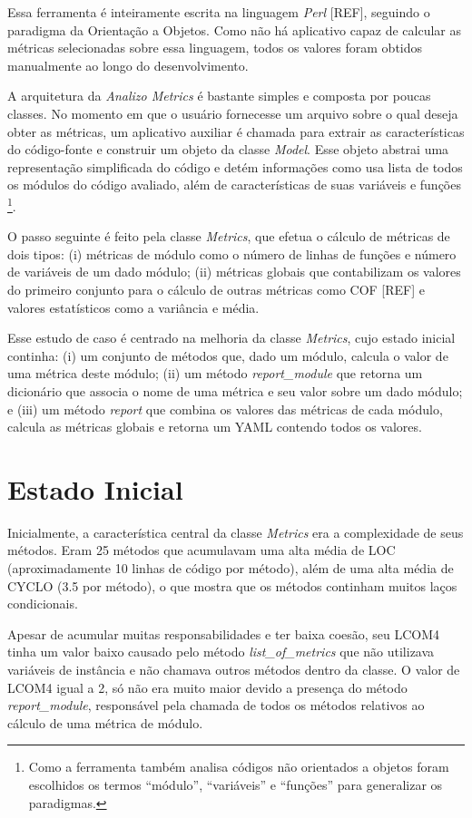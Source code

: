 Essa ferramenta é inteiramente escrita na linguagem \textit{Perl} [REF], seguindo o paradigma da
Orientação a Objetos. Como não há aplicativo capaz de calcular as métricas selecionadas
sobre essa linguagem, todos os valores foram obtidos manualmente ao longo do desenvolvimento.

A arquitetura da \textit{Analizo Metrics} é bastante simples e composta por poucas classes.
No momento em que o usuário fornecesse um arquivo sobre o qual deseja obter as métricas, um aplicativo
auxiliar é chamada para extrair as características do código-fonte e construir um objeto da
classe \textit{Model}. Esse objeto abstrai uma representação simplificada do código e detém 
informações como usa lista de todos os módulos do código avaliado, além de características
de suas variáveis e funções \footnote{Como a ferramenta também analisa códigos não orientados
a objetos foram escolhidos os termos ``módulo'', ``variáveis'' e ``funções'' para generalizar os paradigmas.}.

O passo seguinte é feito pela classe \textit{Metrics}, que efetua o cálculo de métricas de dois 
tipos: (i) métricas de módulo como o número de linhas de funções e número de variáveis de
um dado módulo; (ii) métricas globais que contabilizam os valores do primeiro conjunto para o
cálculo de outras métricas como COF [REF] e valores estatísticos como a variância e média.

Esse estudo de caso é centrado na melhoria da classe \textit{Metrics}, cujo estado inicial continha:
(i) um conjunto de métodos que, dado um módulo, calcula o valor de uma métrica deste módulo;
(ii) um método \textit{report\_module} que retorna um dicionário que associa o nome de uma métrica
e seu valor sobre um dado módulo; e (iii) um método \textit{report} que combina os valores das métricas
de cada módulo, calcula as métricas globais e retorna um YAML contendo todos os valores.

\section{Estado Inicial}
Inicialmente, a característica central da classe \textit{Metrics} era a complexidade de seus métodos.
Eram 25 métodos que acumulavam uma alta média de LOC (aproximadamente 10 linhas de código por método),
além de uma alta média de CYCLO (3.5 por método), o que mostra que os métodos continham muitos laços condicionais.

Apesar de acumular muitas responsabilidades e ter baixa coesão, seu LCOM4 tinha um valor baixo
causado pelo método \textit{list\_of\_metrics} que não utilizava variáveis de instância e não chamava
outros métodos dentro da classe. O valor de LCOM4 igual a 2, só não era muito maior devido a presença
do método \textit{report\_module}, responsável pela chamada de todos os métodos relativos ao cálculo de
uma métrica de módulo.

